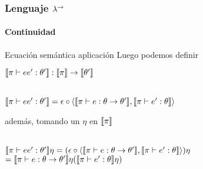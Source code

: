 \documentclass{beamer}
\begin{document}
\begin{frame}
\frametitle{Lenguaje $\lambda^{\rightarrow}$}
\framesubtitle{Continuidad}

\begin{block}{Ecuación semántica aplicación}
Luego podemos definir

\begin{center}
$\llbracket \pi \vdash ee' : \theta' \rrbracket : \llbracket \pi \rrbracket \rightarrow \llbracket \theta' \rrbracket$\\

\

$\llbracket \pi \vdash ee' : \theta' \rrbracket = 
\epsilon \circ \langle \llbracket \pi \vdash e : \theta \rightarrow \theta' \rrbracket
						, \llbracket \pi \vdash e' : \theta \rrbracket \rangle$
\end{center}

además, tomando un $\eta$ en $\llbracket \pi \rrbracket$\\

\

$\llbracket \pi \vdash ee' : \theta' \rrbracket\eta = 
(\epsilon \circ \langle \llbracket \pi \vdash e : \theta \rightarrow \theta' \rrbracket
						, \llbracket \pi \vdash e' : \theta \rrbracket \rangle)\eta$\\
\quad \quad \quad \quad \quad \quad 
$= \llbracket \pi \vdash e : \theta \rightarrow \theta' \rrbracket\eta(\llbracket \pi \vdash e' : \theta \rrbracket\eta)$

\end{block}

\end{frame}
\end{document}
